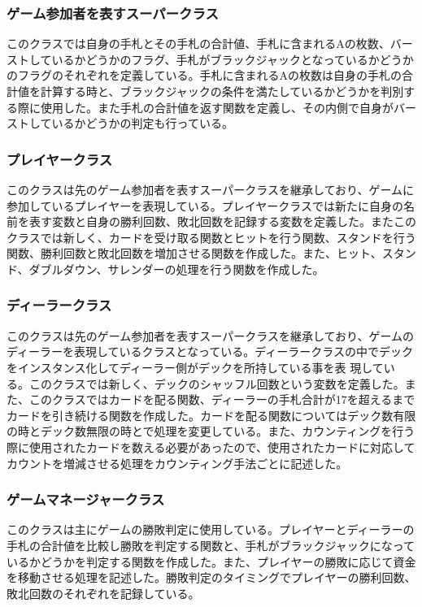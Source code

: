 \subsubsection{ゲーム参加者を表すスーパークラス}
このクラスでは自身の手札とその手札の合計値、手札に含まれるAの枚数、バーストしているかどうかのフラグ、手札がブラックジャックとなっているかどうかのフラグのそれぞれを定義している。手札に含まれるAの枚数は自身の手札の合計値を計算する時と、ブラックジャックの条件を満たしているかどうかを判別する際に使用した。また手札の合計値を返す関数を定義し、その内側で自身がバーストしているかどうかの判定も行っている。

\subsubsection{プレイヤークラス}
このクラスは先のゲーム参加者を表すスーパークラスを継承しており、ゲームに参加しているプレイヤーを表現している。プレイヤークラスでは新たに自身の名前を表す変数と自身の勝利回数、敗北回数を記録する変数を定義した。またこのクラスでは新しく、カードを受け取る関数とヒットを行う関数、スタンドを行う関数、勝利回数と敗北回数を増加させる関数を作成した。また、ヒット、スタンド、ダブルダウン、サレンダーの処理を行う関数を作成した。

\subsubsection{ディーラークラス}
このクラスは先のゲーム参加者を表すスーパークラスを継承しており、ゲームのディーラーを表現しているクラスとなっている。ディーラークラスの中でデックをインスタンス化してディーラー側がデックを所持している事を表
現している。このクラスでは新しく、デックのシャッフル回数という変数を定義した。また、このクラスではカードを配る関数、ディーラーの手札合計が17を超えるまでカードを引き続ける関数を作成した。カードを配る関数についてはデック数有限の時とデック数無限の時とで処理を変更している。また、カウンティングを行う際に使用されたカードを数える必要があったので、使用されたカードに対応してカウントを増減させる処理をカウンティング手法ごとに記述した。

\subsubsection{ゲームマネージャークラス}
このクラスは主にゲームの勝敗判定に使用している。プレイヤーとディーラーの手札の合計値を比較し勝敗を判定する関数と、手札がブラックジャックになっているかどうかを判定する関数を作成した。また、プレイヤーの勝敗に応じて資金を移動させる処理を記述した。勝敗判定のタイミングでプレイヤーの勝利回数、敗北回数のそれぞれを記録している。

